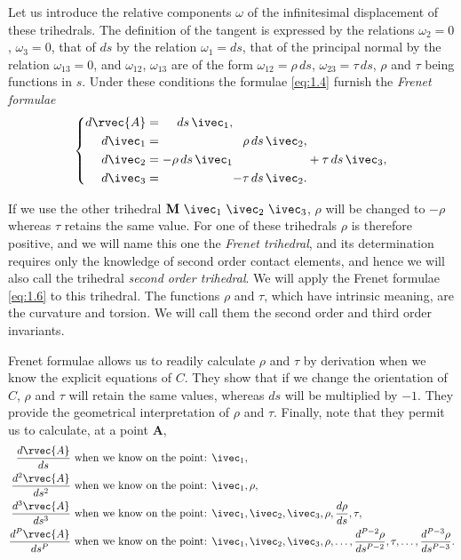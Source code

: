 Let us introduce the relative components $\omega$ of the infinitesimal displacement of these trihedrals. The definition of the tangent is expressed by the relations $\omega_{2}=0$, $\omega_{3}=0$, that of $ds$ by the relation $\omega_{1}=ds$, that of the principal normal by the relation $\omega_{13}=0$, and $\omega_{12}$, $\omega_{13}$ are of the form $\omega_{12}=\rho\,ds$, $\omega_{23}=\tau\,ds$, $\rho$ and $\tau$ being functions in $s$. Under these conditions the formulae \eqref{eq:1.4} furnish the \emph{Frenet formulae}
\begin{equation}
  \label{eq:1.6}
  \left\{
    \begin{alignedat}{3}
      d{\rvec{A}}&=&ds\,\ivec_{1},\\
      d\ivec_{1}&=&&&\rho\,ds\,\ivec_{2},\\
      d\ivec_{2}&={}&-\rho\,ds\,\ivec_{1}&&&+\tau\,ds\,\ivec_{3},\\
      d\ivec_{3}&=&&&-\tau\,ds\,\ivec_{2}.
    \end{alignedat}
  \right.
\end{equation}

If we use the other trihedral $\mathbf{M}\ \ivec_{1}\ \ivec_{2}\ \ivec_{3}$, $\rho$ will be changed to $-\rho$ whereas $\tau$ retains the same value. For one of these trihedrals $\rho$ is therefore positive, and we will name this one the \emph{Frenet trihedral}, and its determination requires only the knowledge of second order contact elements, and hence we will also call the trihedral \emph{second order trihedral}. We will apply the Frenet formulae \eqref{eq:1.6} to this trihedral. The functions $\rho$ and $\tau$, which have intrinsic meaning, are the curvature and torsion. We will call them the second order and third order invariants.

Frenet formulae allows us to readily calculate $\rho$ and $\tau$ by derivation when we know the explicit equations of $C$. They show that if we change the orientation of $C$, $\rho$ and $\tau$ will retain the same values, whereas $ds$ will be multiplied by $-1$. They provide the geometrical interpretation of $\rho$ and $\tau$. Finally, note that they permit us to calculate, at a point $\mathbf{A}$,
\begin{align*}
  \frac{d{\rvec{A}}}{ds}&\text{ when we know on the point: } \ivec_{1},\\
  \frac{d^{2}{\rvec{A}}}{ds^{2}}&\text{ when we know on the point: } \ivec_{1}, \rho,\\
  \frac{d^{3}{\rvec{A}}}{ds^{3}}&\text{ when we know on the point: } \ivec_{1},\ivec_{2},\ivec_{3},\rho,\frac{d\rho}{ds},\tau,\\
  \frac{d^{P}{\rvec{A}}}{ds^{P}}&\text{ when we know on the point: } \ivec_{1},\ivec_{2},\ivec_{3},\rho,\dots,\frac{d^{P-2}\rho}{ds^{P-2}},\tau,\dots,\frac{d^{P-3}\rho}{ds^{P-3}}.
\end{align*}


